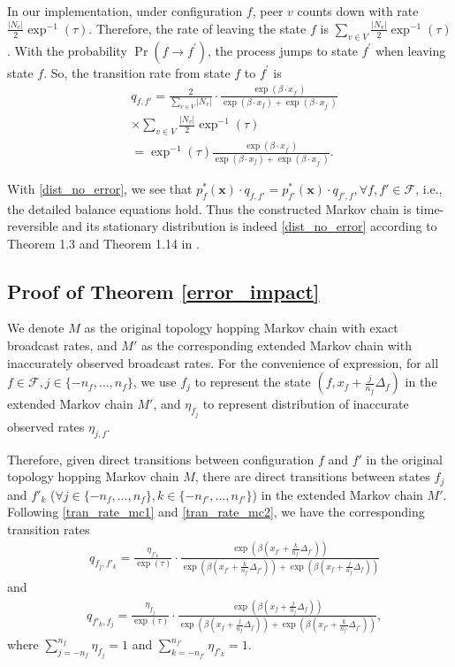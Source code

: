 \documentclass[10pt,conference]{IEEEtran}
\begin{document}
In our implementation, under configuration $f$, peer $v$ counts down
with rate $\frac{|N_v|}{2}\exp^{-1}(\tau)$.
Therefore, the rate of leaving the state $f$ is
$\sum_{v\in{V}}\frac{|N_v|}{2}\exp^{-1}(\tau)$.
With the probability $\Pr(f\rightarrow f^{'})$, the process jumps to state $f^{'}$
when leaving state $f$. So, the transition rate from state $f$ to
$f^{'}$ is
\begin{align}
 & q_{f,f'}=\frac{2}{\sum_{v\in V}|N_v|} \cdot\frac{\exp(\beta\cdot x_{f^{'}})}{\exp(\beta\cdot x_{f})+\exp(\beta\cdot x_{f^{'}})}\nonumber \\
 & \times\sum_{v\in V}\frac{|N_v|}{2}\exp^{-1}(\tau)\nonumber \\
 & =\exp^{-1}(\tau)\frac{\exp(\beta\cdot x_{f^{'}})}{\exp(\beta\cdot x_{f})+\exp(\beta\cdot x_{f^{'}})}.
\end{align}

With \eqref{dist_no_error}, we see that
$p_{f}^{*}(\boldsymbol{x})\cdot
q_{f,f'}=p_{f'}^{*}(\boldsymbol{x})\cdot q_{f',f}, \forall f,f' \in
\mathcal{F}$, i.e., the detailed balance equations hold. Thus the
constructed Markov chain is time-reversible and its stationary
distribution is indeed \eqref{dist_no_error} according to Theorem
1.3 and Theorem 1.14 in \cite{Kelly79}.

\subsection{Proof of Theorem
\ref{error_impact}}\label{sec:error_impact}

We denote $M$ as the original topology hopping Markov chain with
exact broadcast rates, and $M'$ as the corresponding extended Markov
chain with inaccurately observed broadcast rates. For the
convenience of expression, for all $f \in \mathcal{F},
j\in\{-n_{f},\ldots,n_{f}\}$, we use $f_j$ to represent the state
$(f, x_f+\frac{j}{n_f}\Delta_f)$ in the extended Markov chain $M'$,
and $\eta_{f_j}$ to represent distribution of inaccurate observed
rates $\eta_{j,f}$.

Therefore, given direct transitions between configuration $f$ and
$f'$ in the original topology hopping Markov chain $M$, there are
direct transitions between states $f_j$ and $f'_k$ ($\forall
j\in\{-n_{f},\ldots,n_{f}\},k\in\{-n_{f'},\ldots,n_{f'}\}$) in the
extended Markov chain $M'$. Following \eqref{tran_rate_mc1} and
\eqref{tran_rate_mc2}, we have the corresponding transition rates
\begin{align}
& q_{f_j,f'_k}=\frac{\eta_{f'_k}}{\exp(\tau)}\cdot
\frac{\exp(\beta(x_{f'}+\frac{k}{n_{f'}}\Delta_{f'}))}{\exp(\beta(x_{f'}+\frac{k}{n_{f'}}\Delta_{f'}))+\exp(\beta(x_f+\frac{j}{n_f}\Delta_f))} \end{align}
and
\begin{align}
& q_{f'_k,f_j}=\frac{\eta_{f_j}}{\exp(\tau)}\cdot
\frac{\exp(\beta(x_f+\frac{j}{n_f}\Delta_f))}{\exp(\beta(x_f+\frac{j}{n_f}\Delta_f))+\exp(\beta(x_{f'}+\frac{k}{n_{f'}}\Delta_{f'}))},
\end{align}
where $\sum_{j=-n_{f}}^{n_{f}}\eta_{f_j}=1$ and
$\sum_{k=-n_{f'}}^{n_{f'}}\eta_{f'_k}=1$.
\end{document}
